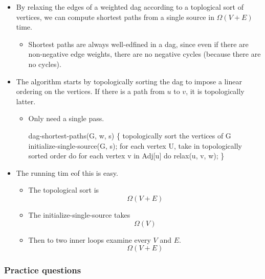 \documentclass[a4paper,11pt]{article}
\begin{document}
\begin{itemize}
\itemsep1pt\parskip0pt
\item
  By relaxing the edges of a weighted dag according to a toplogical sort
  of vertices, we can compute shortest paths from a single source in
  $\Omega(V + E)$ time.

  \begin{itemize}
  \itemsep1pt\parskip0pt
  \item
    Shortest paths are always well-edfined in a dag, since even if there
    are non-negative edge weights, there are no negative cycles (because
    there are no cycles).
  \end{itemize}
\item
  The algorithm starts by topologically sorting the dag to impose a
  linear ordering on the vertices. If there is a path from $u$ to $v$,
  it is topologically latter.

  \begin{itemize}
  \item
    Only need a single pass.

    dag-shortest-paths(G, w, s) \{ topologically sort the vertices of G
    initialize-single-source(G, s); for each vertex U, take in
    topologically sorted order do for each vertex v in Adj{[}u{]} do
    relax(u, v, w); \}
  \end{itemize}
\item
  The running tim eof this is easy.

  \begin{itemize}
  \item
    The topological sort is \[\Omega(V + E)\]
  \item
    The initialize-single-source takes \[\Omega(V)\]
  \item
    Then to two inner loops examine every $V$ and $E$. \[\Omega(V + E)\]
  \end{itemize}
\end{itemize}

\subsubsection{Practice questions}\label{practice-questions-15}
\end{document}
